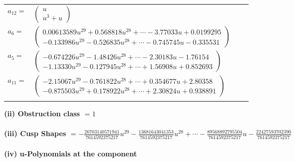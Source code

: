 \documentclass[1p]{elsarticle_modified}
\theoremstyle{definition}
\begin{document}
\begin{tabular}{m{7pt} m{180pt} m{7pt} m{180pt} }
\flushright $a_{12}=$&$\begin{pmatrix}u\\u^3+u\end{pmatrix}$ \\
\flushright $a_{6}=$&$\begin{pmatrix}0.00613589 u^{29}+0.568818 u^{28}+\cdots-3.77033 u+0.0199295\\-0.133986 u^{29}-0.526835 u^{28}+\cdots-0.745745 u-0.335531\end{pmatrix}$ \\
\flushright $a_{5}=$&$\begin{pmatrix}-0.674226 u^{29}-1.48426 u^{28}+\cdots-2.30183 u-1.76154\\-1.13330 u^{29}-0.127945 u^{28}+\cdots+1.56908 u+0.852693\end{pmatrix}$ \\
\flushright $a_{11}=$&$\begin{pmatrix}-2.15067 u^{29}-0.761822 u^{28}+\cdots+0.354677 u+2.80358\\-0.875503 u^{29}+0.178922 u^{28}+\cdots+2.30824 u+0.938891\end{pmatrix}$\\&\end{tabular}
\flushleft \textbf{(ii) Obstruction class $= 1$}\\~\\
\flushleft \textbf{(iii) Cusp Shapes $= -\frac{26703140571941}{7614592375217} u^{29}-\frac{13681643041353}{7614592375217} u^{28}+\cdots-\frac{89568892795504}{7614592375217} u-\frac{22427593702390}{7614592375217}$}\\~\\
\newpage\renewcommand{\arraystretch}{1}
\flushleft \textbf{(iv) u-Polynomials at the component}\newline \\
\end{document}
